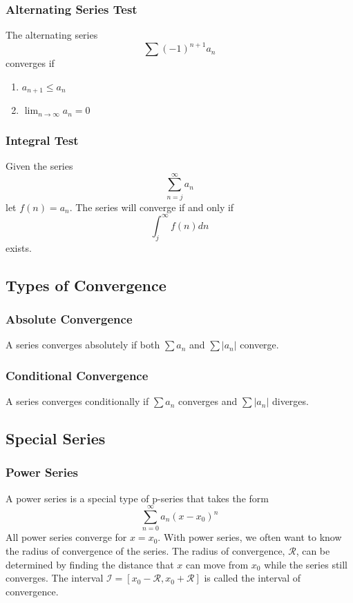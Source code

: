 \documentclass{article}
\begin{document}
\subsubsection{Alternating Series Test}
The alternating series
\[
\sum (-1)^{n+1}a_{n}
\]
converges if
\begin{enumerate}
\item $a_{n+1} \leq a_{n}$
\item $\lim_{n\to\infty}a_{n} = 0$
\end{enumerate}

\subsubsection{Integral Test}
Given the series
\[\sum_{n=j}^{\infty} a_{n}\]
let $f(n) = a_{n}$.
The series will converge if and only if
\[
\int_{j}^{\infty}f(n)dn
\]
exists.


\subsection{Types of Convergence}
\subsubsection{Absolute Convergence}
A series converges absolutely if both $\sum a_{n}$ and $\sum |a_{n}|$ converge.

\subsubsection{Conditional Convergence}
A series converges conditionally if $\sum a_{n}$ converges and $\sum |a_{n}|$ diverges.

\subsection{Special Series}
\subsubsection{Power Series}
A power series is a special type of p-series that takes the form
\[
\sum_{n=0}^{\infty} a_{n}(x-x_{0})^{n}
\]
All power series converge for $x = x_{0}$.
With power series, we often want to know the radius of convergence of the series.
The radius of convergence, $\mathcal{R}$, can be determined by finding the distance that $x$ can move from $x_{0}$ while the series still converges.
The interval $\mathcal{I} = [x_{0} - \mathcal{R}, x_{0} + \mathcal{R}]$ is called the interval of convergence.
\end{document}
